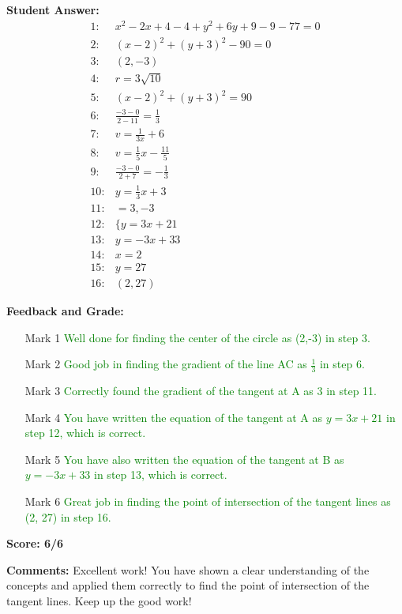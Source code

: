 \documentclass{article}
\begin{document}
\textbf{Student Answer:}
\begin{align*}
1: & x^{2}-2x+4-4+y^{2}+6y+9-9-77=0 \\
2: & (x-2)^{2}+(y+3)^{2}-90=0 \\
3: & (2,-3) \\
4: & r=3\sqrt{10} \\
5: & (x-2)^{2}+(y+3)^{2}=90 \\
6: & \frac{-3-0}{2-11}=\frac{1}{3} \\
7: & v=\frac{1}{3x}+6 \\
8: & v=\frac{1}{5}x-\frac{11}{5} \\
9: & \frac{-3-0}{2+7}=-\frac{1}{3} \\
10: & y=\frac{1}{3}x+3 \\
11: & =3,-3 \\
12: & \{y=3x+21 \\
13: & y=-3x+33 \\
14: & x=2 \\
15: & y=27 \\
16: & (2, 27)
\end{align*}

\textbf{Feedback and Grade:}
\begin{itemize}
\item[Mark 1] \textcolor{green}{Well done for finding the center of the circle as (2,-3) in step 3.}
\item[Mark 2] \textcolor{green}{Good job in finding the gradient of the line AC as $\frac{1}{3}$ in step 6.}
\item[Mark 3] \textcolor{green}{Correctly found the gradient of the tangent at A as 3 in step 11.}
\item[Mark 4] \textcolor{green}{You have written the equation of the tangent at A as $y=3x+21$ in step 12, which is correct.}
\item[Mark 5] \textcolor{green}{You have also written the equation of the tangent at B as $y=-3x+33$ in step 13, which is correct.}
\item[Mark 6] \textcolor{green}{Great job in finding the point of intersection of the tangent lines as (2, 27) in step 16.}
\end{itemize}

\textbf{Score: 6/6}

\textbf{Comments:} Excellent work! You have shown a clear understanding of the concepts and applied them correctly to find the point of intersection of the tangent lines. Keep up the good work!
\end{document}

